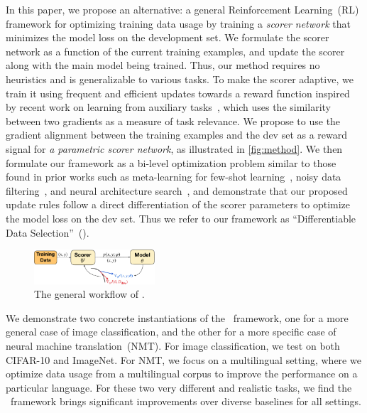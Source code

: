 In this paper, we propose an alternative: a general Reinforcement Learning~(RL) framework for optimizing training data usage by training a \emph{scorer network} that minimizes the model loss on the development set.
We formulate the scorer network as a function of the current training examples, and update the scorer along with the main model being trained. Thus, our method requires no heuristics and is generalizable to various tasks. To make the scorer adaptive, we train it using frequent and efficient updates towards a reward function inspired by recent work on learning from auxiliary tasks~\citep{cos_sim,meta_aux_learn}, which uses the similarity between two gradients as a measure of task relevance.
We propose to use the gradient alignment between the training examples and the dev set as a reward signal for \emph{a parametric scorer network}, as illustrated in \autoref{fig:method}. We then formulate our framework as a bi-level optimization problem similar to those found in prior works such as meta-learning for few-shot learning~\citep{finn2017model}, noisy data filtering~\citep{learn_reweight}, and neural architecture search~\citep{darts}, and demonstrate that our proposed update rules follow a direct differentiation of the scorer parameters to optimize the model loss on the dev set.
Thus we refer to our framework as ``Differentiable Data Selection''~(\dds).

\begin{figure}
    \centering
    \includegraphics[width=0.4\textwidth]{figs/method_plot_crop.pdf}
    \caption{The general workflow of \dds.}
    \label{fig:method}
\end{figure}

We demonstrate two concrete instantiations of the \dds~framework, one for a more general case of image classification, and the other for a more specific case of neural machine translation~(NMT). For image classification, we test on both CIFAR-10 and ImageNet. For NMT, we focus on a multilingual setting, where we optimize data usage from a multilingual corpus to improve the performance on a particular language. %
For these two very different and realistic tasks, we find the \dds~framework brings significant improvements over diverse baselines for all settings.